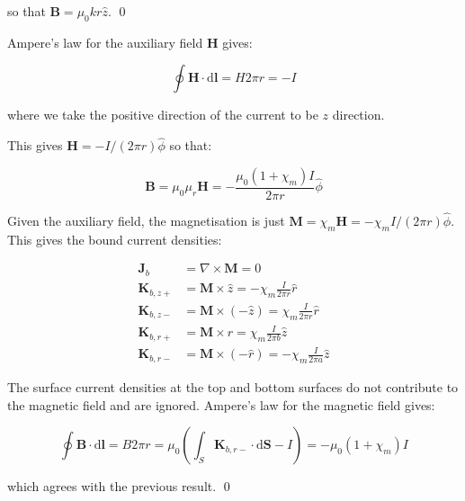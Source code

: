 \documentclass[12pt]{article}
\begin{document}
so that $\mathbf{B} = \mu_{0} kr \hat{z}$.
\qed


Ampere's law for the auxiliary field $\mathbf{H}$ gives:

\begin{equation}
    \oint \mathbf{H} \cdot \mathrm{d}\mathbf{l} = H 2\pi r = -I
\end{equation}

where we take the positive direction of the current to be $z$ direction.

This gives $\mathbf{H} = -I/(2\pi r) \hat{\phi}$ so that:

\begin{equation}
    \mathbf{B} = \mu_{0} \mu_{r} \mathbf{H} = -\frac{\mu_{0} (1 + \chi_{m}) I}{2\pi r} \hat{\phi}
\end{equation}

Given the auxiliary field, the magnetisation is just $\mathbf{M} = \chi_{m} \mathbf{H} = -\chi_{m} I/(2\pi r) \hat{\phi}$. This gives the bound current densities:

\begin{equation}
    \begin{split}
        \mathbf{J}_{b} &= \nabla \times \mathbf{M} = 0 \\
        \mathbf{K}_{b,z+} &= \mathbf{M} \times \hat{z} = -\chi_{m} \frac{I}{2\pi r} \hat{r} \\
        \mathbf{K}_{b,z-} &= \mathbf{M} \times (-\hat{z}) = \chi_{m} \frac{I}{2\pi r} \hat{r} \\
        \mathbf{K}_{b,r+} &= \mathbf{M} \times \hat{r} = \chi_{m} \frac{I}{2\pi b} \hat{z} \\
        \mathbf{K}_{b,r-} &= \mathbf{M} \times (-\hat{r}) = -\chi_{m} \frac{I}{2\pi a} \hat{z}
    \end{split}
\end{equation}

The surface current densities at the top and bottom surfaces do not contribute to the magnetic field and are ignored. Ampere's law for the magnetic field gives:

\begin{equation}
    \oint \mathbf{B} \cdot \mathrm{d}\mathbf{l} = B 2\pi r = \mu_{0} \left( \int_{S} \mathbf{K}_{b, r-} \cdot \mathrm{d}\mathbf{S} - I \right) = -\mu_{0} (1 + \chi_{m}) I
\end{equation}

which agrees with the previous result.
\qed
\end{document}

